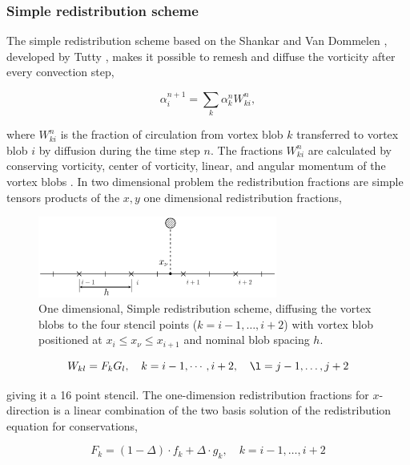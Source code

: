 \subsubsection*{Simple redistribution scheme}

The simple redistribution scheme based on the Shankar and Van Dommelen \cite{Shankar1996}, developed by Tutty \cite{2010arXiv1009.0166T}, makes it possible to remesh and diffuse the vorticity after every convection step, 

	\begin{equation}
	\alpha_i^{n+1} = \sum_k \alpha_k^n W_{ki}^n, 
	\end{equation}

where $W_{ki}^n$ is the fraction of circulation from vortex blob $k$ transferred to vortex blob $i$ by diffusion during the time step $n$. The fractions $W_{ki}^n$ are calculated by conserving vorticity, center of vorticity, linear, and angular momentum of the vortex blobs \cite{2010arXiv1009.0166T}. In two dimensional problem the redistribution fractions are simple tensors products of the $x,y$ one dimensional redistribution fractions,


	\begin{figure}[!b]
	\centering
	\includegraphics[width=0.7\textwidth]{figures/lagrangian/simpleRedistribution.pdf}
	\caption{One dimensional, Simple redistribution scheme, diffusing the vortex blobs to the four stencil points ($k=i-1,\dots,i+2$) with vortex blob positioned at $x_i \le x_{\nu} \le x_{i+1}$ and nominal blob spacing $h$.}
	\label{fig:simpleRedistribution}
	\end{figure}

	\begin{equation}
	W_{kl} = F_k G_l, \quad k = i-1,\cdots,i+2, \quad \l = j-1,\dots,j+2
	\end{equation}

giving it a 16 point stencil. The one-dimension redistribution fractions for $x$-direction is a linear combination of the two basis solution of the redistribution equation for conservations,

	\begin{equation}
	F_k = \left(1-\Delta\right)\cdot f_k + \Delta\cdot g_k, \quad k = i-1,\dots,i+2
	\end{equation}

